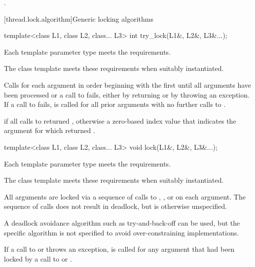 \begin{itemdescr}
\pnum
\returns
{}.
\end{itemdescr}

[thread.lock.algorithm]{Generic locking algorithms}

%
\begin{itemdecl}
template<class L1, class L2, class... L3> int try_lock(L1&, L2&, L3&...);
\end{itemdecl}

\begin{itemdescr}
\pnum
\expects
Each template parameter type meets the  requirements.
\begin{note}
The
 class template meets these requirements when suitably instantiated.
\end{note}

\pnum
\effects
Calls  for each argument in order beginning with the
first until all arguments have been processed or a call to  fails,
either by returning  or by throwing an exception. If a call to
 fails,  is called for all prior arguments
with no further calls to .

\pnum
\returns
{} if all calls to  returned ,
otherwise a zero-based index value that indicates the argument for which 
returned .
\end{itemdescr}

%
\begin{itemdecl}
template<class L1, class L2, class... L3> void lock(L1&, L2&, L3&...);
\end{itemdecl}

\begin{itemdescr}
\pnum
\expects
Each template parameter type meets the  requirements.
\begin{note}
The
 class template meets these requirements when suitably instantiated.
\end{note}

\pnum
\effects
All arguments are locked via a sequence of calls to ,
, or  on each argument. The sequence of calls does
not result in deadlock, but is otherwise unspecified.
\begin{note}
A deadlock avoidance
algorithm such as try-and-back-off can be used, but the specific algorithm is not
specified to avoid over-constraining implementations.
\end{note}
If a call to
 or  throws an exception,  is
called for any argument that had been locked by a call to  or
.
\end{itemdescr}


